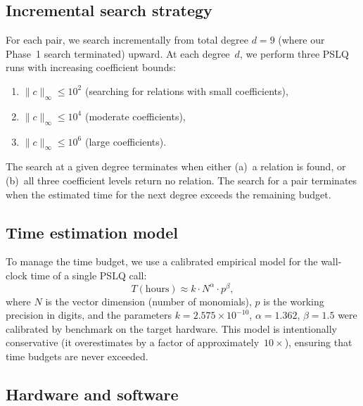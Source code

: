 \documentclass[11pt]{amsart}
\theoremstyle{remark}
\newcommand{\norm}[1]{\lVert #1 \rVert}
\begin{document}
\subsection{Incremental search strategy}\label{ssec:strategy}

For each pair, we search incrementally from total degree $d=9$ (where our Phase~1
search terminated) upward. At each degree~$d$, we perform three PSLQ runs with
increasing coefficient bounds:
\begin{enumerate}
\item $\norm{c}_\infty\le 10^2$ (searching for relations with small coefficients),
\item $\norm{c}_\infty\le 10^4$ (moderate coefficients),
\item $\norm{c}_\infty\le 10^6$ (large coefficients).
\end{enumerate}
The search at a given degree terminates when either (a)~a relation is found, or
(b)~all three coefficient levels return no relation. The search for a pair terminates
when the estimated time for the next degree exceeds the remaining budget.

\subsection{Time estimation model}\label{ssec:timemodel}

To manage the time budget, we use a calibrated empirical model for the wall-clock
time of a single PSLQ call:
\begin{equation}\label{eq:timemodel}
  T(\text{hours}) \approx k\cdot N^\alpha\cdot p^\beta,
\end{equation}
where $N$ is the vector dimension (number of monomials), $p$ is the working precision
in digits, and the parameters $k=2.575\times 10^{-10}$, $\alpha=1.362$, $\beta=1.5$
were calibrated by benchmark on the target hardware. This model is intentionally
conservative (it overestimates by a factor of approximately~$10\times$), ensuring
that time budgets are never exceeded.

\subsection{Hardware and software}\label{ssec:hardware}
\end{document}
